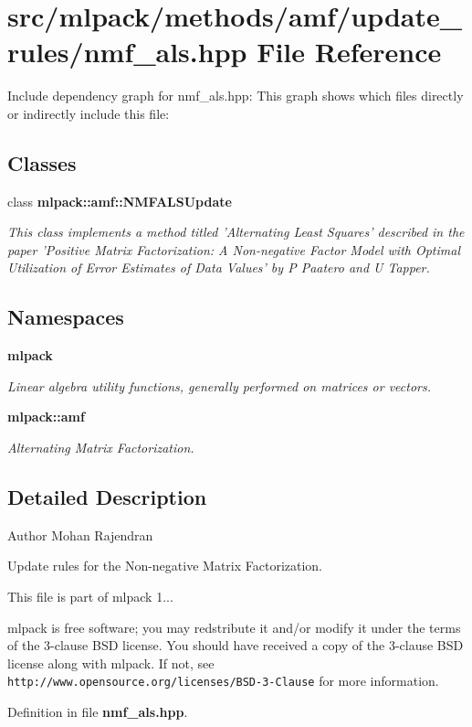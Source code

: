 \section{src/mlpack/methods/amf/update\-\_\-rules/nmf\-\_\-als.hpp File Reference}
\label{nmf__als_8hpp}
Include dependency graph for nmf\-\_\-als.\-hpp\-:
This graph shows which files directly or indirectly include this file\-:
\subsection*{Classes}
\begin{DoxyCompactItemize}
\item 
class {\bf mlpack\-::amf\-::\-N\-M\-F\-A\-L\-S\-Update}
\begin{DoxyCompactList}\small\item\em This class implements a method titled 'Alternating Least Squares' described in the paper 'Positive Matrix Factorization\-: A Non-\/negative Factor Model with Optimal Utilization of Error Estimates of Data Values' by P Paatero and U Tapper. \end{DoxyCompactList}\end{DoxyCompactItemize}
\subsection*{Namespaces}
\begin{DoxyCompactItemize}
\item 
{\bf mlpack}
\begin{DoxyCompactList}\small\item\em Linear algebra utility functions, generally performed on matrices or vectors. \end{DoxyCompactList}\item 
{\bf mlpack\-::amf}
\begin{DoxyCompactList}\small\item\em Alternating Matrix Factorization. \end{DoxyCompactList}\end{DoxyCompactItemize}


\subsection{Detailed Description}
\begin{DoxyAuthor}{Author}
Mohan Rajendran
\end{DoxyAuthor}
Update rules for the Non-\/negative Matrix Factorization.

This file is part of mlpack 1...

mlpack is free software; you may redstribute it and/or modify it under the terms of the 3-\/clause B\-S\-D license. You should have received a copy of the 3-\/clause B\-S\-D license along with mlpack. If not, see {\tt http\-://www.\-opensource.\-org/licenses/\-B\-S\-D-\/3-\/\-Clause} for more information. 

Definition in file {\bf nmf\-\_\-als.\-hpp}.

